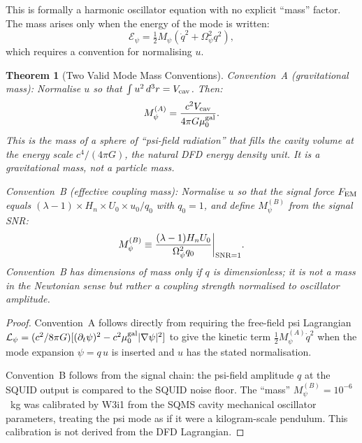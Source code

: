 \documentclass[11pt,twocolumn]{article}
\newcommand{\lam}{\lambda}
\newcommand{\Opsi}{\Omega_\psi}
\newcommand{\Mpsi}{M_\psi}
\newcommand{\half}{\tfrac{1}{2}}
\newcommand{\Heff}{H_n}
\newcommand{\Ucav}{U_0}
\newcommand{\VcavSym}{V_{\rm cav}}
\newtheorem{theorem}{Theorem}[section]
\theoremstyle{definition}
\theoremstyle{remark}
\begin{document}
This is formally a harmonic oscillator equation with no explicit ``mass''
factor. The mass arises only when the energy of the mode is written:
\begin{equation}
\mathcal{E}_\psi = \half\Mpsi(\dot{q}^2 + \Opsi^2 q^2),
\label{eq:mode_energy}
\end{equation}
which requires a convention for normalising $u$.

\begin{theorem}[Two Valid Mode Mass Conventions]
\label{thm:two_conventions}
Convention~A (\emph{gravitational mass}): Normalise $u$ so that
$\int u^2\,d^3r = \VcavSym$. Then:
\begin{equation}
\Mpsi^{(A)} = \frac{c^2\VcavSym}{4\pi G\mu_0^{\rm gal}}.
\label{eq:MpsiA}
\end{equation}
This is the mass of a sphere of ``psi-field radiation'' that fills the
cavity volume at the energy scale $c^4/(4\pi G)$, the natural DFD
energy density unit. It is a \emph{gravitational} mass, not a
particle mass.

Convention~B (\emph{effective coupling mass}): Normalise $u$ so that
the signal force $F_{\rm EM}$ equals $(\lam-1)\times\Heff\times\Ucav\times u_0/q_0$
with $q_0 = 1$, and define $\Mpsi^{(B)}$ from the signal SNR:
\begin{equation}
\Mpsi^{(B)} \equiv \frac{(\lam-1)\Heff\Ucav}{\Opsi^2 q_0}
\bigg|_{{\rm SNR}=1}.
\label{eq:MpsiB}
\end{equation}
Convention~B has dimensions of mass only if $q$ is dimensionless;
it is not a mass in the Newtonian sense but rather a \emph{coupling
strength normalised to oscillator amplitude}.
\end{theorem}

\begin{proof}
Convention~A follows directly from requiring the free-field psi Lagrangian
$\mathcal{L}_\psi = (c^2/8\pi G)[(\partial_t\psi)^2 - c^2\mu_0^{\rm gal}|\nabla\psi|^2]$
to give the kinetic term $\half\Mpsi^{(A)}\dot{q}^2$ when the mode
expansion $\psi = q\,u$ is inserted and $u$ has the stated normalisation.

Convention~B follows from the signal chain: the psi-field amplitude
$q$ at the SQUID output is compared to the SQUID noise floor.
The ``mass'' $\Mpsi^{(B)} = 10^{-6}$~kg was calibrated
by W3i1 from the SQMS cavity mechanical oscillator parameters,
treating the psi mode as if it were a kilogram-scale pendulum.
This calibration is not derived from the DFD Lagrangian.
\end{proof}
\end{document}
